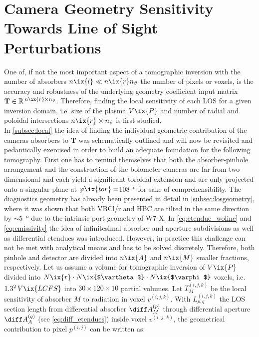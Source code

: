     \section{Camera Geometry Sensitivity Towards Line of Sight Perturbations}\label{sec:geomimpact}%
%
        One of, if not the most important aspect of a tomographic inversion with the number of absorbers $n\ix{l}\ll n\ix{r}n_{\text{$\vartheta$}}$ the number of pixels or voxels, is the accuracy and robustness of the underlying geometry coefficient input matrix $\mathbf{T}\in\mathbb{R}\,^{n\ix{r}\times n_{\text{$\vartheta$}}}$. Therefore, finding the local sensitivity of each LOS for a given inversion domain, i.e. size of the plasma $V\ix{P}$ and number of radial and poloidal intersections $n\ix{r}\times n_{\text{$\vartheta$}}$ is first studied.\\%
        In \cref{subsec:local} the idea of finding the individual geometric contribution of the cameras absorbers to $\mathbf{T}$ was schematically outlined and will now be revisited and pedantically exercised in order to build an adequate foundation for the following tomography. First one has to remind themselves that both the absorber-pinhole arrangement and the construction of the bolometer cameras are far from two-dimensional and each yield a significant toroidal extension and are only projected onto a singular plane at $\varphi\ix{tor}=$\SI{108}{\degree} for sake of comprehensibility. The diagnostics geometry has already been presented in detail in \cref{subsec:losgeometry}, where it was shown that both VBCl/r and HBC are tilted in the same direction by $\sim$\SI{5}{\degree} due to the intrinsic port geometry of W7-X. In \cref{eq:etendue_woline} and \cref{eq:emissivity} the idea of infinitesimal absorber and aperture subdivisions as well as differential etendues was introduced. However, in practice this challenge can not be met with analytical means and has to be solved discretely. Therefore, both pinhole and detector are divided into $n\ix{A}$ and $n\ix{M}$ smaller fractions, respectively. Let us assume a volume for tomographic inversion of $V\ix{P}$ divided into $N\ix{r}\cdot N\ix{$\vartheta$}\cdot N\ix{$\varphi$}$ voxels, i.e. $1.3^{2}\,V\ix{LCFS}$ into $30\times120\times10$ partial volumes. Let $T^{\left(i,j,k\right)}_{M}$ be the local sensitivity of absorber $M$ to radiation in voxel $v^{\left(i,j,k\right)}$. With $L^{\left(i,j,k\right)}_{p,q}$ the LOS section length from differential absorber $\diff A_{M}^{\left(p\right)}$ through differential aperture $\diff A_{A}^{\left(q\right)}$ (see \cref{eq:diff_etendues}) inside voxel $v^{\left(i,\,j,\,k\right)}$, the geometrical contribution to pixel $p^{\left(i,j\right)}$ can be written as:
